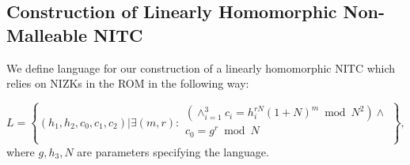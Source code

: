 \subsection{Construction of Linearly Homomorphic Non-Malleable NITC}
We define language for our construction of a linearly homomorphic NITC which relies on NIZKs in the ROM in the following way:

\[
L = \left\{(h_1, h_2, c_0, c_1, c_2)| \exists (m,r):
\begin{aligned}
       (\land_{i=1}^3 c_i = h_i^{rN}(1+N)^m \bmod N^2) \land \\
       c_0 = g^r \bmod N\\
    \end{aligned}
    \right\}, 
\]
where $g, h_3, N$ are parameters specifying the language.




